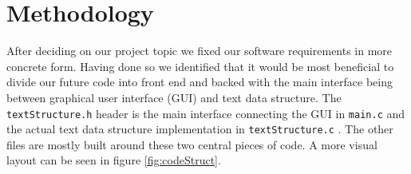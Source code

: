 \section{Methodology}\label{sec:meto}
After deciding on our project topic we fixed our software requirements in more concrete form. Having done so we identified that it would be most beneficial to divide our future code into front end and backed with the main interface being between graphical user interface (GUI) and text data structure. The \verb|textStructure.h| header is the main interface connecting the GUI in \verb|main.c| and the actual text data structure implementation in \verb|textStructure.c| \cite{GithubRepo}. The other files are mostly built around these two central pieces of code. A more visual layout can be seen in figure \ref{fig:codeStruct}.
